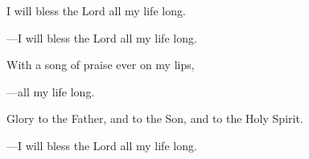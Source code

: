 \responsory
\begin{hangpar}

I will bless the Lord all my life long.

{\color{red}---\thinspace}I will bless the Lord all my life long.

\medskip With a song of praise ever on my lips,

{\color{red}---\thinspace}all my life long.

\medskip Glory to the Father, and to the Son, and to the Holy Spirit.

{\color{red}---\thinspace}I will bless the Lord all my life long.
\end{hangpar}
